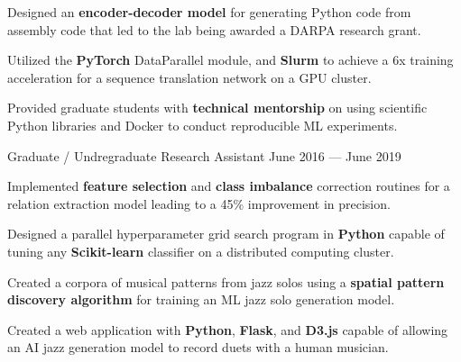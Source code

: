 \begin{cventries}
{\begin{cvitems}
        \item Designed an \textbf{encoder-decoder model} for generating Python  code from assembly code that led to the lab being awarded a DARPA research grant.
        \item Utilized the \textbf{PyTorch} DataParallel module, and \textbf{Slurm} to achieve a 6x training acceleration for a sequence translation network on a GPU cluster.
        \item Provided graduate students with \textbf{technical mentorship} on using scientific Python libraries and Docker to conduct reproducible ML experiments.
      \end{cvitems}
    }
    \vspace{.07cm}
  \cventry
    {Graduate / Undregraduate Research Assistant} %
    {} %
    {} %
    {June 2016 --- June 2019} %
    {
      \vspace{-0.1cm}
      \begin{cvitems} %
        \item Implemented \textbf{feature selection} and \textbf{class imbalance} correction routines for a relation extraction model leading to a 45\% improvement in precision.
        \item Designed a parallel hyperparameter grid search program in \textbf{Python} capable of tuning any \textbf{Scikit-learn} classifier on a distributed computing cluster.
        \item Created a corpora of musical patterns from jazz solos using a \textbf{spatial pattern discovery algorithm} for training an ML jazz solo generation model.
        \item Created a web application with \textbf{Python}, \textbf{Flask}, and \textbf{D3.js} capable of allowing an AI jazz generation model to record duets with a human musician.

\end{cvitems}}
\end{cventries}
